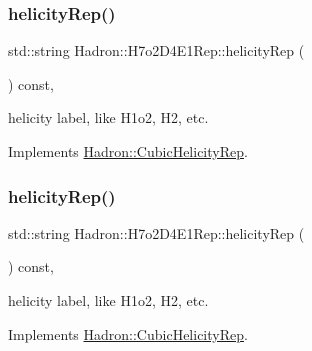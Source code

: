 \mbox{\label{structHadron_1_1H7o2D4E1Rep_adb6d012951f61d6cf35b8c9ad1df0435}} 
\subsubsection{\texorpdfstring{helicityRep()}{helicityRep()}\hspace{0.1cm}{\footnotesize\ttfamily [1/2]}}
{\footnotesize\ttfamily std\+::string Hadron\+::\+H7o2\+D4\+E1\+Rep\+::helicity\+Rep (\begin{DoxyParamCaption}{ }\end{DoxyParamCaption}) const\hspace{0.3cm}{\ttfamily [inline]}, {\ttfamily [virtual]}}

helicity label, like H1o2, H2, etc. 

Implements \mbox{\hyperlink{structHadron_1_1CubicHelicityRep_af1096946b7470edf0a55451cc662f231}{Hadron\+::\+Cubic\+Helicity\+Rep}}.

\mbox{\label{structHadron_1_1H7o2D4E1Rep_adb6d012951f61d6cf35b8c9ad1df0435}} 
\subsubsection{\texorpdfstring{helicityRep()}{helicityRep()}\hspace{0.1cm}{\footnotesize\ttfamily [2/2]}}
{\footnotesize\ttfamily std\+::string Hadron\+::\+H7o2\+D4\+E1\+Rep\+::helicity\+Rep (\begin{DoxyParamCaption}{ }\end{DoxyParamCaption}) const\hspace{0.3cm}{\ttfamily [inline]}, {\ttfamily [virtual]}}

helicity label, like H1o2, H2, etc. 

Implements \mbox{\hyperlink{structHadron_1_1CubicHelicityRep_af1096946b7470edf0a55451cc662f231}{Hadron\+::\+Cubic\+Helicity\+Rep}}.

\mbox{\label{structHadron_1_1H7o2D4E1Rep_ae6cc5dc38275bfce35b58694bc85cfe1}} 
